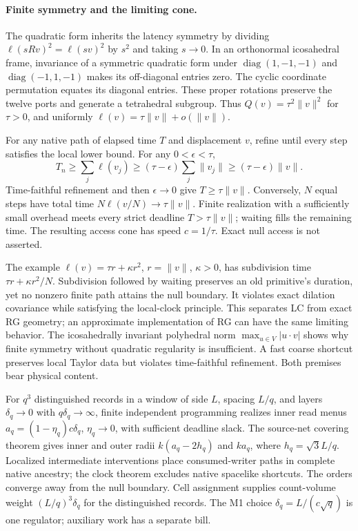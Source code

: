 \paragraph{Finite symmetry and the limiting cone.}
The quadratic form inherits the latency symmetry by dividing
$\ell(sRv)^2=\ell(sv)^2$ by $s^2$ and taking $s\to0$.
In an orthonormal icosahedral frame, invariance of a symmetric quadratic form
under $\operatorname{diag}(1,-1,-1)$ and
$\operatorname{diag}(-1,1,-1)$ makes its off-diagonal entries zero. The cyclic
coordinate permutation equates its diagonal entries. These proper rotations
preserve the twelve ports and generate a tetrahedral subgroup. Thus
$Q(v)=\tau^2\|v\|^2$ for $\tau>0$, and uniformly
$\ell(v)=\tau\|v\|+o(\|v\|)$.

For any native path of elapsed time $T$ and displacement $v$, refine until
every step satisfies the local lower bound. For any $0<\epsilon<\tau$,
\[
 T_n\geq\sum_j\ell(v_j)
 \geq(\tau-\epsilon)\sum_j\|v_j\|
 \geq(\tau-\epsilon)\|v\|.
\]
Time-faithful refinement and then $\epsilon\to0$ give $T\geq\tau\|v\|$.
Conversely, $N$ equal steps have total time $N\ell(v/N)\to\tau\|v\|$.
Finite realization with a sufficiently small overhead meets every strict
deadline $T>\tau\|v\|$; waiting fills the remaining time. The resulting
access cone has speed $c=1/\tau$. Exact null access is not asserted.

The example $\ell(v)=\tau r+\kappa r^2$, $r=\|v\|$, $\kappa>0$, has
subdivision time $\tau r+\kappa r^2/N$. Subdivision followed by waiting
preserves an old primitive's duration, yet no nonzero finite path attains
the null boundary. It violates exact dilation covariance while satisfying
the local-clock principle. This separates LC from exact RG geometry; an
approximate implementation of RG can have the same limiting behavior.
The icosahedrally invariant polyhedral norm
$\max_{u\in V}|u\cdot v|$ shows why finite symmetry without quadratic
regularity is insufficient. A fast coarse shortcut preserves local Taylor
data but violates time-faithful refinement. Both premises bear physical
content.

For $q^3$ distinguished records in a window of side $L$, spacing $L/q$,
and layers $\delta_q\to0$ with $q\delta_q\to\infty$, finite independent
programming realizes inner read menus
$a_q=(1-\eta_q)c\delta_q$, $\eta_q\to0$, with sufficient deadline slack.
The source-net covering theorem gives inner and outer radii
$k(a_q-2h_q)$ and $ka_q$, where $h_q=\sqrt3L/q$. Localized intermediate
interventions place consumed-writer paths in complete native ancestry;
the clock theorem excludes native spacelike shortcuts. The orders converge
away from the null boundary. Cell assignment supplies count-volume weight
$(L/q)^3\delta_q$ for the distinguished records. The M1 choice
$\delta_q=L/(c\sqrt q)$ is one regulator; auxiliary work has a separate bill.

